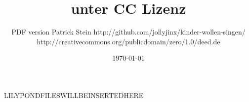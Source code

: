 \documentclass[10pt]{article}
\title{ unter CC Lizenz}
\author{ PDF version Patrick Stein http://github.com/jollyjinx/kinder-wollen-singen/  \\ http://creativecommons.org/publicdomain/zero/1.0/deed.de }
\date{\today}
\begin{document}
\maketitle

\begin{adjustwidth}{4cm}{4cm}
\tableofcontents
\end{adjustwidth}

\pagebreak

LILYPONDFILESWILLBEINSERTEDHERE
\end{document}
